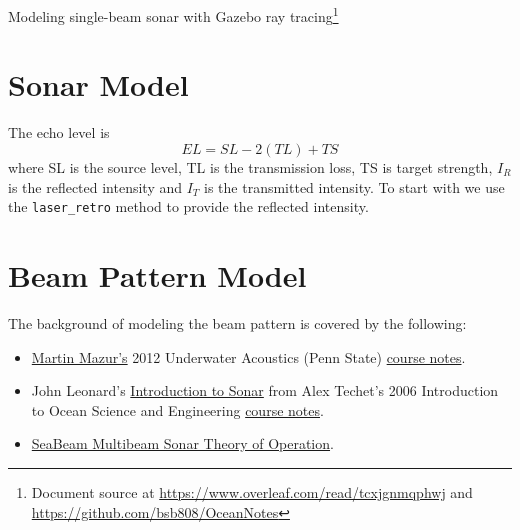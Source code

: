 \documentclass[11pt]{article}
\newcommand{\doctitle}{Modeling single-beam sonar with Gazebo ray tracing}
\begin{document}
\setlength{\IEEEnormaljot}{10pt}%


\newcommand{\SF}{0.7}
\newcommand{\SFb}{0.45}
\newcommand{\SFPic}{0.45}
\newcommand{\SFPlot}{0.45}
\newcommand{\SFc}{0.52}
\newcommand{\FigWidth}{\SF}


\newpage
\setcounter{page}{1}
\begin{center}
{\huge \doctitle}\footnote{Document source at \url{https://www.overleaf.com/read/tcxjgnmqphwj} and \url{https://github.com/bsb808/OceanNotes}}
\end{center}


\section{Sonar Model}

The echo level is
\[
EL = SL - 2(TL)+ TS %
\]
where SL is the source level, TL is the transmission loss, TS is target strength, $I_R$ is the reflected intensity and $I_T$ is the transmitted intensity.  To start with we use the \verb+laser_retro+ method to provide the reflected intensity.

\section{Beam Pattern Model}

The background of modeling the beam pattern is covered by the following:
\begin{itemize}
\item \href{http://www.personal.psu.edu/faculty/m/x/mxm14/}{Martin Mazur's} 2012 Underwater Acoustics (Penn State) \href{http://www.personal.psu.edu/faculty/m/x/mxm14/sonar/Mazur-sonar_signal_processing_combined.pdf}{course notes}.
\item John Leonard's \href{https://ocw.mit.edu/courses/mechanical-engineering/2-011-introduction-to-ocean-science-and-engineering-spring-2006/readings/hw5_sonar_leonar.pdf}{Introduction to Sonar} from Alex Techet's 2006 Introduction to Ocean Science and Engineering \href{https://ocw.mit.edu/courses/mechanical-engineering/2-011-introduction-to-ocean-science-and-engineering-spring-2006/}{course notes}.
\item \href{https://www3.mbari.org/data/mbsystem/sonarfunction/SeaBeamMultibeamTheoryOperation.pdf}{SeaBeam Multibeam Sonar Theory of Operation}.
\end{itemize}
\end{document}
